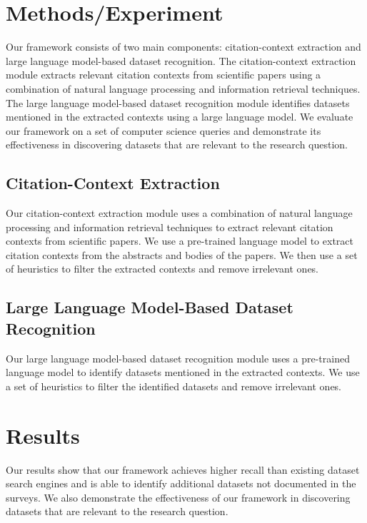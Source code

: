 \documentclass{article}
\begin{document}
        \section{Methods/Experiment}

        Our framework consists of two main components: citation-context extraction and large language model-based dataset recognition. The citation-context extraction module extracts relevant citation contexts from scientific papers using a combination of natural language processing and information retrieval techniques. The large language model-based dataset recognition module identifies datasets mentioned in the extracted contexts using a large language model. We evaluate our framework on a set of computer science queries and demonstrate its effectiveness in discovering datasets that are relevant to the research question.

        \subsection{Citation-Context Extraction}

        Our citation-context extraction module uses a combination of natural language processing and information retrieval techniques to extract relevant citation contexts from scientific papers. We use a pre-trained language model to extract citation contexts from the abstracts and bodies of the papers. We then use a set of heuristics to filter the extracted contexts and remove irrelevant ones.

        \subsection{Large Language Model-Based Dataset Recognition}

        Our large language model-based dataset recognition module uses a pre-trained language model to identify datasets mentioned in the extracted contexts. We use a set of heuristics to filter the identified datasets and remove irrelevant ones.

        \section{Results}

        Our results show that our framework achieves higher recall than existing dataset search engines and is able to identify additional datasets not documented in the surveys. We also demonstrate the effectiveness of our framework in discovering datasets that are relevant to the research question.
\end{document}
